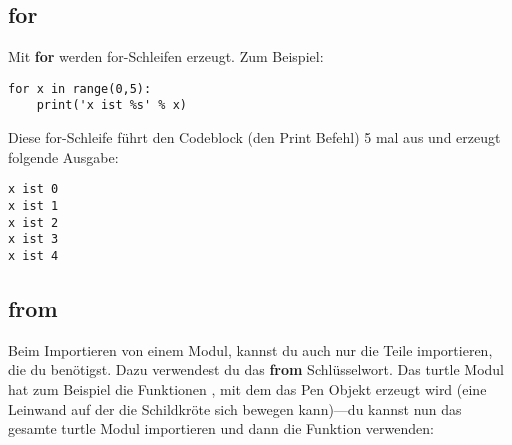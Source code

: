 \subsection*{for}

Mit \textbf{for} werden for-Schleifen erzeugt. Zum Beispiel:

\begin{Verbatim}[frame=single]
for x in range(0,5):
    print('x ist %s' % x)
\end{Verbatim}

\noindent
Diese for-Schleife führt den Codeblock (den Print Befehl) 5 mal aus und erzeugt folgende Ausgabe:

\begin{Verbatim}[frame=single]
x ist 0
x ist 1
x ist 2
x ist 3
x ist 4
\end{Verbatim}

\subsection*{from}

Beim Importieren von einem Modul, kannst du auch nur die Teile importieren, die du benötigst. Dazu verwendest du das \textbf{from} Schlüsselwort. Das turtle Modul hat zum Beispiel die Funktionen , mit dem das Pen Objekt erzeugt wird (eine Leinwand auf der die Schildkröte sich bewegen kann)---du kannst nun das gesamte turtle Modul importieren und dann die  Funktion verwenden:

